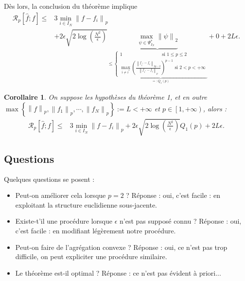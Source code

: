 \documentclass[11pt,letterpaper]{article}
\newtheorem{cor}{Corollaire}
\begin{document}
\par Dès lors, la conclusion du théorème implique
\begin{equation}
	\begin{split}
		\mathcal{R}_p \left[ \hat{f}; f\right] \leq & 3 \min\limits_{i \in I_N} \left\| f - f_i \right\|_p \\
		& + 2 \epsilon \sqrt{2 \log \left( \frac{N^2}{\epsilon} \right)} \underbrace{\max\limits_{\psi \in \Psi_{I_N}^{*}} \left\| \psi \right\|_2}_{ \leq \underbrace{\left\lbrace \substack{ 1 \quad \quad \quad \quad \quad \quad \quad \quad \text{ si } 1 \leq p \leq 2 \\ \max\limits_{i \neq i^*} \left( \frac{\left\| f_{i^*} - f_i \right\|_{2p - 2}}{\left\| f_{i^*} - f_i \right\|_{p}} \right)^{p-1} \text{ si } 2 < p < + \infty} \right.}_{=: Q_1 \left( p \right)} } +  0 + 2 L \epsilon .
	\end{split}
\end{equation}

\begin{cor}

\par On suppose les hypothèses du théorème 1, et en outre $\max \left\lbrace \left\| f \right\|_p, \left\| f_1 \right\|_p , \cdots, \left\| f_N \right\|_p \right\rbrace := L < + \infty$ et $p \in \left[1, +\infty \right)$, alors :
\begin{equation}
	\begin{split}
		\mathcal{R}_p \left[ \hat{f}; f\right] \leq & 3 \min\limits_{i \in I_N} \left\| f - f_i \right\|_p + 2 \epsilon \sqrt{2 \log \left( \frac{N^2}{\epsilon} \right)} Q_1 \left( p \right) + 2 L \epsilon .
	\end{split}
\end{equation}
\end{cor}


\subsection{Questions}

\par Quelques questions se posent :
\begin{itemize}
\item Peut-on améliorer cela lorsque $p = 2$ ? Réponse : oui, c'est facile : en exploitant la structure euclidienne sous-jacente.
\item Existe-t'il une procédure lorsque $\epsilon$ n'est pas supposé connu ? Réponse : oui, c'est facile : en modifiant légèrement notre procédure.
\item Peut-on faire de l'agrégation convexe ? Réponse : oui, ce n'est pas trop difficile, on peut expliciter une procédure similaire.
\item Le théorème est-il optimal ? Réponse : ce n'est pas évident à priori...
\end{itemize}
\end{document}
